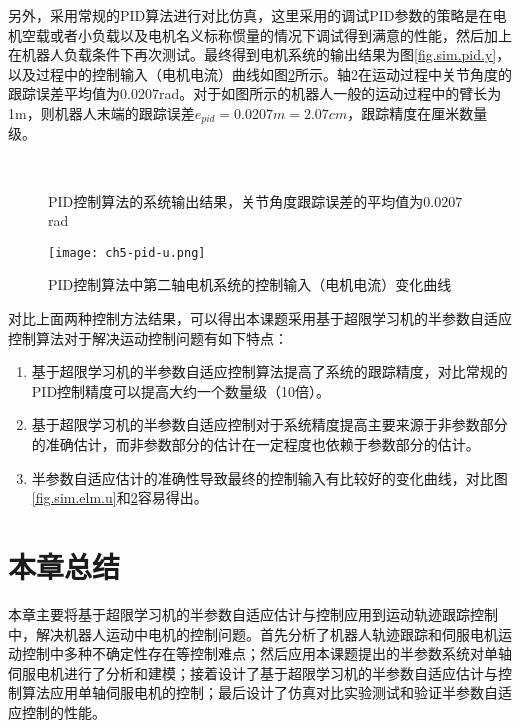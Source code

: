 另外，采用常规的PID算法进行对比仿真，这里采用的调试PID参数的策略是在电机空载或者小负载以及电机名义标称惯量的情况下调试得到满意的性能，然后加上在机器人负载条件下再次测试。最终得到电机系统的输出结果为图\ref{fig.sim.pid.y}，以及过程中的控制输入（电机电流）曲线如图\ref{fig.sim.pid.u}所示。轴2在运动过程中关节角度的跟踪误差平均值为$0.0207$rad。对于如图所示的机器人一般的运动过程中的臂长为1m，则机器人末端的跟踪误差$e_{pid}=0.0207m=2.07cm$，跟踪精度在厘米数量级。
\begin{figure}[!htb]
	\centering
	\\
	\caption{PID控制算法的系统输出结果，关节角度跟踪误差的平均值为$0.0207$rad}
	\label{fig.sim.pid.yye}
\end{figure}

\begin{figure}[!htb]
	\centering
	\texttt{[image: ch5-pid-u.png]}\\	 %
	\caption{PID控制算法中第二轴电机系统的控制输入（电机电流）变化曲线}
	\label{fig.sim.pid.u}
\end{figure}

对比上面两种控制方法结果，可以得出本课题采用基于超限学习机的半参数自适应控制算法对于解决运动控制问题有如下特点：
\begin{enumerate}
\item 基于超限学习机的半参数自适应控制算法提高了系统的跟踪精度，对比常规的PID控制精度可以提高大约一个数量级（10倍）。
\item 基于超限学习机的半参数自适应控制对于系统精度提高主要来源于非参数部分的准确估计，而非参数部分的估计在一定程度也依赖于参数部分的估计。
\item 半参数自适应估计的准确性导致最终的控制输入有比较好的变化曲线，对比图\ref{fig.sim.elm.u}和\ref{fig.sim.pid.u}容易得出。
\end{enumerate}

\section{本章总结}
本章主要将基于超限学习机的半参数自适应估计与控制应用到运动轨迹跟踪控制中，解决机器人运动中电机的控制问题。首先分析了机器人轨迹跟踪和伺服电机运动控制中多种不确定性存在等控制难点；然后应用本课题提出的半参数系统对单轴伺服电机进行了分析和建模；接着设计了基于超限学习机的半参数自适应估计与控制算法应用单轴伺服电机的控制；最后设计了仿真对比实验测试和验证半参数自适应控制的性能。